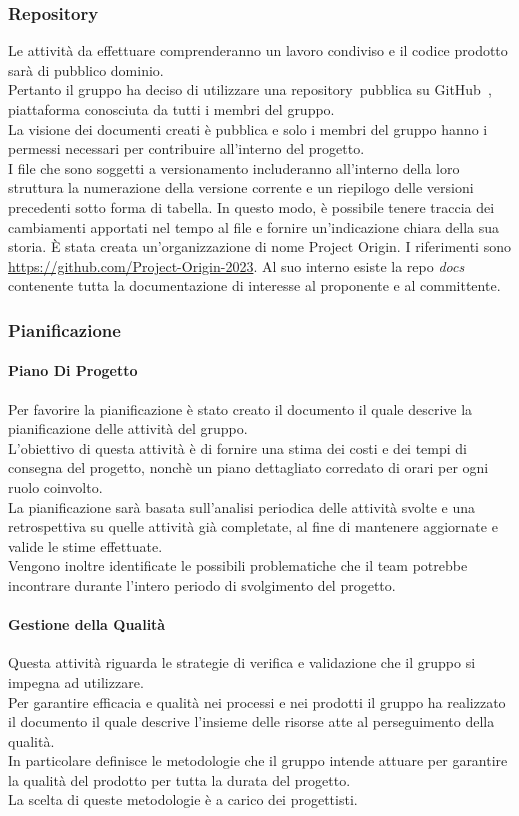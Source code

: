 \subsubsection{Repository} 
Le attività da effettuare comprenderanno un lavoro condiviso e il codice prodotto sarà di pubblico dominio. \\
Pertanto il gruppo ha deciso di utilizzare una repository\glo\ pubblica su GitHub\glo\ , piattaforma conosciuta da tutti i membri del gruppo. \\
La visione dei documenti creati è pubblica e solo i membri del gruppo hanno i permessi necessari per contribuire all'interno del progetto. \\
I file che sono soggetti a versionamento includeranno all'interno della loro struttura la numerazione della versione corrente e un riepilogo 
delle versioni precedenti sotto forma di tabella. In questo modo, è possibile tenere traccia dei cambiamenti apportati nel tempo al file e 
fornire un'indicazione chiara della sua storia.
È stata creata un'organizzazione di nome Project Origin. I riferimenti sono \url{https://github.com/Project-Origin-2023}.
Al suo interno esiste la repo \textit{docs} contenente tutta la documentazione di interesse al proponente e al committente.

\subsubsection{Pianificazione}\label{pianificazione}
\paragraph{Piano Di Progetto}
Per favorire la pianificazione è stato creato il documento \PdPdocumento il quale descrive la pianificazione delle attività del gruppo.\\
L’obiettivo di questa attività è di fornire una stima dei costi e dei tempi di consegna del progetto,
nonchè un piano dettagliato corredato di orari per ogni ruolo coinvolto.\\
La pianificazione sarà basata sull’analisi periodica delle attività svolte e una retrospettiva su quelle attività
già completate, al fine di mantenere aggiornate e valide le stime effettuate.\\
Vengono inoltre identificate le possibili problematiche che il team potrebbe incontrare
durante l’intero periodo di svolgimento del progetto.
\paragraph{Gestione della Qualità}
Questa attività riguarda le strategie di verifica e validazione che il gruppo si impegna ad utilizzare.\\
Per garantire efficacia e qualità nei processi e nei prodotti il gruppo ha realizzato il documento \PdQdocumento il quale descrive l’insieme delle risorse atte al perseguimento della qualità.\\
In particolare definisce le metodologie che il gruppo intende attuare per
garantire la qualità del prodotto per tutta la durata del progetto.\\
La scelta di queste metodologie è a carico dei progettisti.


